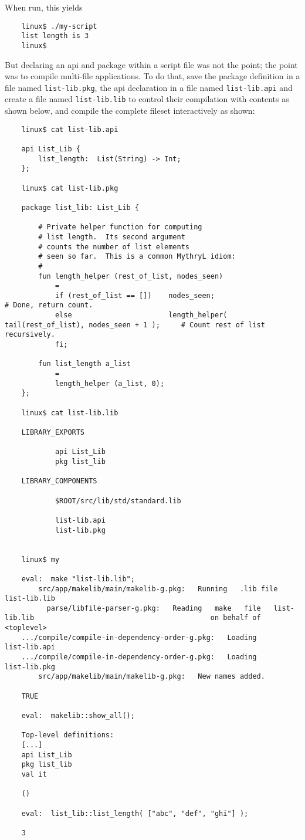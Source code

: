 When run, this yields

\begin{verbatim}
    linux$ ./my-script
    list length is 3
    linux$ 
\end{verbatim}

But declaring an api and package within a script file was not the point; 
the point was to compile multi-file applications.  To do that, save 
the package definition in a file named {\tt list-lib.pkg}, the api 
declaration in a file named {\tt list-lib.api} and create a file 
named {\tt list-lib.lib} to control their compilation with contents 
as shown below, and compile the complete fileset interactively as shown:

\begin{verbatim}
    linux$ cat list-lib.api

    api List_Lib {
        list_length:  List(String) -> Int;
    };

    linux$ cat list-lib.pkg

    package list_lib: List_Lib {

        # Private helper function for computing
        # list length.  Its second argument
        # counts the number of list elements
        # seen so far.  This is a common MythryL idiom:
        #
        fun length_helper (rest_of_list, nodes_seen)
            =
            if (rest_of_list == [])    nodes_seen;                                              # Done, return count. 
            else                       length_helper( tail(rest_of_list), nodes_seen + 1 );     # Count rest of list recursively.
            fi;

        fun list_length a_list
            =
            length_helper (a_list, 0);
    };

    linux$ cat list-lib.lib

    LIBRARY_EXPORTS

            api List_Lib
            pkg list_lib

    LIBRARY_COMPONENTS

            $ROOT/src/lib/std/standard.lib

            list-lib.api
            list-lib.pkg


    linux$ my

    eval:  make "list-lib.lib";
        src/app/makelib/main/makelib-g.pkg:   Running   .lib file    list-lib.lib
          parse/libfile-parser-g.pkg:   Reading   make   file   list-lib.lib                                          on behalf of <toplevel>
    .../compile/compile-in-dependency-order-g.pkg:   Loading                 list-lib.api
    .../compile/compile-in-dependency-order-g.pkg:   Loading                 list-lib.pkg
        src/app/makelib/main/makelib-g.pkg:   New names added.

    TRUE

    eval:  makelib::show_all();

    Top-level definitions:
    [...]
    api List_Lib
    pkg list_lib
    val it

    ()

    eval:  list_lib::list_length( ["abc", "def", "ghi"] );

    3
\end{verbatim}

